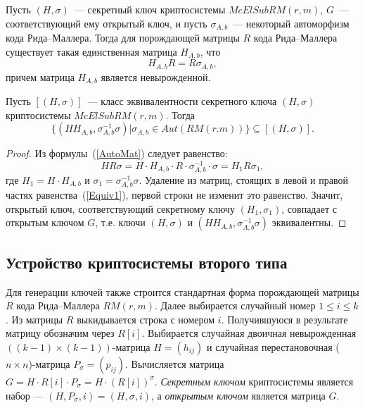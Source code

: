 Пусть \((H,\sigma)\)~--- секретный ключ криптосистемы \(McElSubRM(r,m)\), \(G\)~--- соответствующий ему открытый ключ, и пусть \(\sigma_{A,b}\)~--- некоторый автоморфизм кода Рида--Маллера.
Тогда для порождающей матрицы \(R\) кода Рида--Маллера существует такая единственная матрица \(H_{A,b}\),  что
\begin{equation}
	\label{AutoMat}
	H_{A,b}R=R\sigma_{A,b},
\end{equation}
причем матрица \(H_{A,b}\) является невырожденной.
\begin{theorem}
	Пусть \([(H,\sigma)]\)~--- класс эквивалентности секретного ключа \((H,\sigma)\) криптосистемы \(McElSubRM(r,m)\).
	Тогда
	\begin{displaymath}
		\{(HH_{A,b},\sigma^{-1}_{A,b}\sigma)|\sigma_{A,b}\in Aut(RM(r.m))\}\subseteq [(H,\sigma)].
	\end{displaymath}
\end{theorem}

\begin{proof}
	Из формулы~(\ref{AutoMat}) следует равенство:
	\begin{equation}\label{Equiv1}
		HR\sigma =H\cdot H_{A,b}\cdot R\cdot \sigma_{A,b}^{-1}\cdot \sigma=H_1R\sigma_1,
	\end{equation}
	где \(H_1=H\cdot H_{A,b}\) и \(\sigma_1=\sigma^{-1}_{A,b}\sigma\).
	Удаление из матриц, стоящих в левой и правой частях равенства~(\ref{Equiv1}), первой строки не изменит это равенство.
	Значит, открытый ключ, соответствующий секретному ключу \((H_{1},\sigma_1)\), совпадает с открытым ключом \(G\), т.е.
	ключи \((H,\sigma)\) и \((HH_{A,b},\sigma^{-1}_{A,b}\sigma)\) эквивалентны.
\end{proof}

\subsection{Устройство криптосистемы второго типа}
Для генерации ключей также строится стандартная форма порождающей матрицы \(R\) кода Рида--Маллера \(RM(r,m).\)  Далее выбирается случайный номер \(1\leqslant  i\leqslant k\).
Из матрицы \(R\) выкидывается строка с номером \(i.\) Получившуюся в результате матрицу обозначим через \(R[i]\).
Выбирается случайная двоичная невырожденная \(((k-1)\times (k-1))\)-матрица \(H=(h_{ij})\) и случайная перестановочная (\(n\times n\))-матрица \(P_{\sigma}=(p_{ij})\).
Вычисляется матрица \(G=H\cdot R[i]\cdot P_{\sigma}=H\cdot (R[i])^{\sigma}.\) \emph{Секретным ключом} криптосистемы является набор --- \((H,P_{\sigma},i)=(H,\sigma,i)\), а \emph{открытым ключом} является матрица \(G\).

